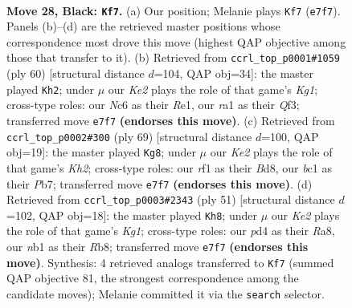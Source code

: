 \documentclass[11pt]{article}
\begin{document}
\clearpage

\begin{figure}[p]\centering
\begin{subfigure}{0.46\textwidth}\centering
\resizebox{\linewidth}{!}{%
\newchessgame
\chessboard[
  setfen={r1r5/pppbk3/q1n2p2/P1Q5/1P1Pp3/6P1/8/RNB2RK1 b - - 1 28},
  showmover=false,
  pgfstyle=straightmove, color=movearrow, markmove={e7-f7}
]}
\caption{}
\end{subfigure}\hfill
\begin{subfigure}{0.46\textwidth}\centering
\resizebox{\linewidth}{!}{%
\newchessgame
\chessboard[
  setfen={1r2r1k1/2p2p2/6qp/p5p1/P2PNnPP/5Q2/5P2/3RR1K1 w - - 1 31},
  showmover=false,
  pgfstyle=straightmove, color=movearrow, markmove={g1-h2}
]}
\caption{}
\end{subfigure}
\\[4pt]
\begin{subfigure}{0.46\textwidth}\centering
\resizebox{\linewidth}{!}{%
\newchessgame
\chessboard[
  setfen={1r1b4/1p5k/p1n1q2r/P1QNp1p1/4Pp2/2B2P2/2P3RP/3R3K b - - 9 35},
  showmover=false,
  pgfstyle=straightmove, color=movearrow, markmove={h7-g8}
]}
\caption{}
\end{subfigure}\hfill
\begin{subfigure}{0.46\textwidth}\centering
\resizebox{\linewidth}{!}{%
\newchessgame
\chessboard[
  setfen={rr4k1/5pp1/p6p/2pqP2P/3nR1Q1/2B2P2/1P3P1K/R7 b - - 3 26},
  showmover=false,
  pgfstyle=straightmove, color=movearrow, markmove={g8-h8}
]}
\caption{}
\end{subfigure}
\caption{\textbf{Move 28, Black: \texttt{Kf7}.} (a) Our position; Melanie plays \texttt{Kf7} (\texttt{e7f7}). Panels (b)--(d) are the retrieved master positions whose correspondence most drove this move (highest QAP objective among those that transfer to it). (b) Retrieved from \texttt{ccrl\_top\_p0001\#1059} (ply 60) [structural distance $d$=104, QAP obj=34]: the master played \texttt{Kh2}; under $\mu$ our \emph{Ke2} plays the role of that game's \emph{Kg1}; cross-type roles: our \emph{N}c6 as their \emph{R}e1, our \emph{r}a1 as their \emph{Q}f3; transferred move \texttt{e7f7} \textbf{(endorses this move)}. (c) Retrieved from \texttt{ccrl\_top\_p0002\#300} (ply 69) [structural distance $d$=100, QAP obj=19]: the master played \texttt{Kg8}; under $\mu$ our \emph{Ke2} plays the role of that game's \emph{Kh2}; cross-type roles: our \emph{r}f1 as their \emph{B}d8, our \emph{b}c1 as their \emph{P}b7; transferred move \texttt{e7f7} \textbf{(endorses this move)}. (d) Retrieved from \texttt{ccrl\_top\_p0003\#2343} (ply 51) [structural distance $d$=102, QAP obj=18]: the master played \texttt{Kh8}; under $\mu$ our \emph{Ke2} plays the role of that game's \emph{Kg1}; cross-type roles: our \emph{p}d4 as their \emph{R}a8, our \emph{n}b1 as their \emph{R}b8; transferred move \texttt{e7f7} \textbf{(endorses this move)}. Synthesis: 4 retrieved analogs transferred to \texttt{Kf7} (summed QAP objective 81, the strongest correspondence among the candidate moves); Melanie committed it via the \texttt{search} selector.}
\label{fig:thought-m55}
\end{figure}
\end{document}
